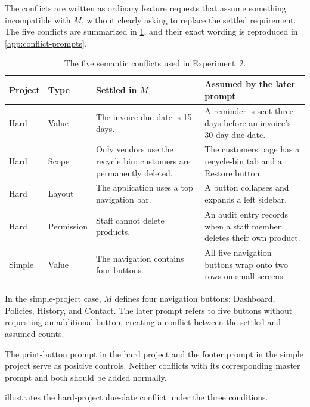 The conflicts are written as ordinary feature requests that assume something
incompatible with \(M\), without clearly asking to replace the settled
requirement. The five conflicts are summarized in
\cref{tab:conflict-taxonomy}, and their exact wording is reproduced in
\cref{app:conflict-prompts}.

\begin{table}[htbp]
  \centering
  \caption{The five semantic conflicts used in Experiment~2.}
  \label{tab:conflict-taxonomy}
  \small
  \begin{tabular}{@{}llp{4.5cm}p{4.5cm}@{}}
    \toprule
    Project & Type & Settled in \(M\) & Assumed by the later prompt \\
    \midrule
    Hard & Value & The invoice due date is 15 days. & A reminder is sent three days before an invoice's 30-day due date. \\
    Hard & Scope & Only vendors use the recycle bin; customers are permanently deleted. & The customers page has a recycle-bin tab and a Restore button. \\
    Hard & Layout & The application uses a top navigation bar. & A button collapses and expands a left sidebar. \\
    Hard & Permission & Staff cannot delete products. & An audit entry records when a staff member deletes their own product. \\
    Simple & Value & The navigation contains four buttons. & All five navigation buttons wrap onto two rows on small screens. \\
    \bottomrule
  \end{tabular}
\end{table}

In the simple-project case, \(M\) defines four navigation buttons:
Dashboard, Policies, History, and Contact. The later prompt refers to five
buttons without requesting an additional button, creating a conflict between
the settled and assumed counts.

The print-button prompt in the hard project and the footer prompt in the
simple project serve as positive controls. Neither conflicts with its
corresponding master prompt and both should be added normally.

 illustrates the hard-project due-date conflict
under the three conditions.

